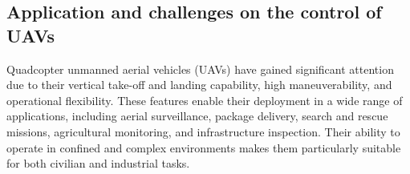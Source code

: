 






\subsection{Application and challenges on the control of UAVs}
\noindent Quadcopter unmanned aerial vehicles (UAVs) have gained significant attention due to their vertical take-off and landing capability, high maneuverability, and operational flexibility. These features enable their deployment in a wide range of applications, including aerial surveillance, package delivery, search and rescue missions, agricultural monitoring, and infrastructure inspection. Their ability to operate in confined and complex environments makes them particularly suitable for both civilian and industrial tasks.

